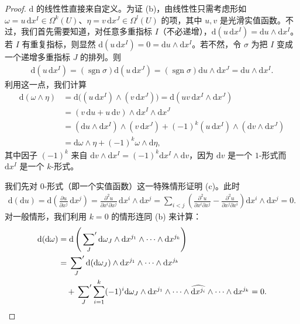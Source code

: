 \documentclass[../../main.tex]{subfiles}
\begin{document}
\begin{proof}
$\mathrm{d}$ 的线性性直接来自定义。为证 (b)，由线性性只需考虑形如 $\omega=u\,\mathrm{d}x^I\in\Omega^k(U)$、$\eta=v\,\mathrm{d}x^J\in\Omega^l(U)$ 的项，其中 $u,v$ 是光滑实值函数。不过，我们首先需要知道，对任意多重指标 $I$（不必递增），$\mathrm{d}(u\,\mathrm{d}x^I)=\mathrm{d}u\wedge\mathrm{d}x^I$。若 $I$ 有重复指标，则显然 $\mathrm{d}(u\,\mathrm{d}x^I)=0=\mathrm{d}u\wedge\mathrm{d}x^I$。若不然，令 $\sigma$ 为把 $I$ 变成一个递增多重指标 $J$ 的排列。则
\begin{align*}
\mathrm{d}(u\,\mathrm{d}x^I)=(\operatorname{sgn}\sigma)\mathrm{d}(u\,\mathrm{d}x^J)
=(\operatorname{sgn}\sigma)\mathrm{d}u\wedge\mathrm{d}x^J=\mathrm{d}u\wedge\mathrm{d}x^I.
\end{align*}
利用这一点，我们计算
\begin{align*}
\mathrm{d}(\omega\wedge\eta)
&=\mathrm{d}\bigl((u\,\mathrm{d}x^I)\wedge(v\,\mathrm{d}x^J)\bigr)
=\mathrm{d}(uv\,\mathrm{d}x^I\wedge\mathrm{d}x^J)\\
&=(v\,\mathrm{d}u+u\,\mathrm{d}v)\wedge\mathrm{d}x^I\wedge\mathrm{d}x^J\\
&=(\mathrm{d}u\wedge\mathrm{d}x^I)\wedge(v\,\mathrm{d}x^J)+(-1)^k(u\,\mathrm{d}x^I)\wedge(\mathrm{d}v\wedge\mathrm{d}x^J)\\
&=\mathrm{d}\omega\wedge\eta+(-1)^k\omega\wedge\mathrm{d}\eta,
\end{align*}
其中因子 $(-1)^k$ 来自 $\mathrm{d}v\wedge\mathrm{d}x^I=(-1)^k\mathrm{d}x^I\wedge\mathrm{d}v$，因为 $\mathrm{d}v$ 是一个 $1$-形式而 $\mathrm{d}x^I$ 是一个 $k$-形式。

我们先对 $0$-形式（即一个实值函数）这一特殊情形证明 (c)。此时
\begin{align*}
\mathrm{d}(\mathrm{d}u)=\mathrm{d}\left(\frac{\partial u}{\partial x^j}\,\mathrm{d}x^j\right)
=\frac{\partial^2 u}{\partial x^i\partial x^j}\,\mathrm{d}x^i\wedge\mathrm{d}x^j
=\sum_{i<j}\left(\frac{\partial^2 u}{\partial x^i\partial x^j}-\frac{\partial^2 u}{\partial x^j\partial x^i}\right)\mathrm{d}x^i\wedge\mathrm{d}x^j=0.
\end{align*}
对一般情形，我们利用 $k=0$ 的情形连同 (b) 来计算：
\begin{align*}
\mathrm{d}(\mathrm{d}\omega)
&=\mathrm{d}\left(\sideset{}{'}\sum_J\mathrm{d}\omega_J\wedge\mathrm{d}x^{j_1}\wedge\cdots\wedge\mathrm{d}x^{j_k}\right)\\
&=\sideset{}{'}\sum_J\mathrm{d}(\mathrm{d}\omega_J)\wedge\mathrm{d}x^{j_1}\wedge\cdots\wedge\mathrm{d}x^{j_k}\\
&\quad+\sideset{}{'}\sum_J\sum_{i=1}^k(-1)^i\mathrm{d}\omega_J\wedge\mathrm{d}x^{j_1}\wedge\cdots\wedge\widehat{\mathrm{d}x^{j_i}}\wedge\cdots\wedge\mathrm{d}x^{j_k}=0.
\end{align*}


\end{proof}
\end{document}
